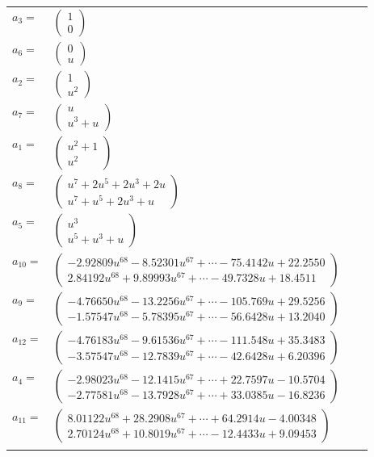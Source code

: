 \documentclass[1p]{elsarticle_modified}
\theoremstyle{definition}
\begin{document}
\begin{tabular}{m{7pt} m{180pt} m{7pt} m{180pt} }
\flushright $a_{3}=$&$\begin{pmatrix}1\\0\end{pmatrix}$ \\
\flushright $a_{6}=$&$\begin{pmatrix}0\\u\end{pmatrix}$ \\
\flushright $a_{2}=$&$\begin{pmatrix}1\\u^2\end{pmatrix}$ \\
\flushright $a_{7}=$&$\begin{pmatrix}u\\u^3+u\end{pmatrix}$ \\
\flushright $a_{1}=$&$\begin{pmatrix}u^2+1\\u^2\end{pmatrix}$ \\
\flushright $a_{8}=$&$\begin{pmatrix}u^7+2 u^5+2 u^3+2 u\\u^7+u^5+2 u^3+u\end{pmatrix}$ \\
\flushright $a_{5}=$&$\begin{pmatrix}u^3\\u^5+u^3+u\end{pmatrix}$ \\
\flushright $a_{10}=$&$\begin{pmatrix}-2.92809 u^{68}-8.52301 u^{67}+\cdots-75.4142 u+22.2550\\2.84192 u^{68}+9.89993 u^{67}+\cdots-49.7328 u+18.4511\end{pmatrix}$ \\
\flushright $a_{9}=$&$\begin{pmatrix}-4.76650 u^{68}-13.2256 u^{67}+\cdots-105.769 u+29.5256\\-1.57547 u^{68}-5.78395 u^{67}+\cdots-56.6428 u+13.2040\end{pmatrix}$ \\
\flushright $a_{12}=$&$\begin{pmatrix}-4.76183 u^{68}-9.61536 u^{67}+\cdots-111.548 u+35.3483\\-3.57547 u^{68}-12.7839 u^{67}+\cdots-42.6428 u+6.20396\end{pmatrix}$ \\
\flushright $a_{4}=$&$\begin{pmatrix}-2.98023 u^{68}-12.1415 u^{67}+\cdots+22.7597 u-10.5704\\-2.77581 u^{68}-13.7928 u^{67}+\cdots+33.0385 u-16.8236\end{pmatrix}$ \\
\flushright $a_{11}=$&$\begin{pmatrix}8.01122 u^{68}+28.2908 u^{67}+\cdots+64.2914 u-4.00348\\2.70124 u^{68}+10.8019 u^{67}+\cdots-12.4433 u+9.09453\end{pmatrix}$\\&\end{tabular}
\end{document}
